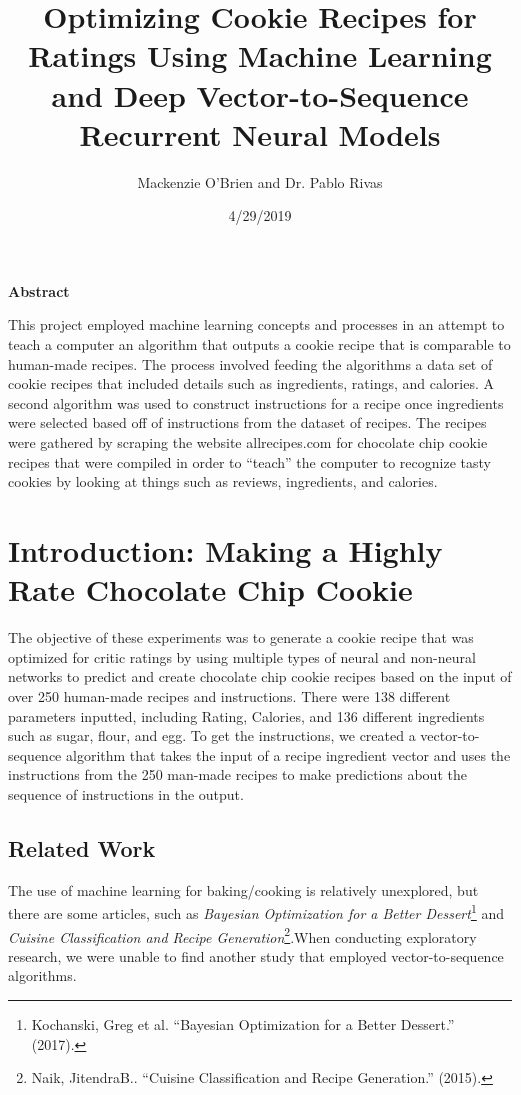 \documentclass[11pt, a4paper]{article}
\begin{document}
	
	\title{Optimizing Cookie Recipes for Ratings Using Machine Learning and Deep Vector-to-Sequence Recurrent Neural Models}
	\author{Mackenzie O'Brien and Dr. Pablo Rivas}
	\date{4/29/2019}
	\maketitle
	\begin{center}
		\textbf{Abstract}
	\end{center}

	This project employed machine learning concepts and processes in an attempt to teach a computer an algorithm that outputs a cookie recipe that is comparable to human-made recipes.
The process involved feeding the algorithms a data set of cookie recipes that included details such as ingredients, ratings, and calories. A second algorithm was used to construct instructions for a recipe once ingredients were selected based off of instructions from the dataset of recipes.
The recipes were gathered by scraping the website allrecipes.com for chocolate chip cookie recipes that were compiled in order to “teach” the computer to recognize tasty cookies by looking at things such as reviews, ingredients, and calories.
	
	\newpage
	
		\section{ Introduction: Making a Highly Rate Chocolate Chip Cookie}
		 The objective of these experiments was to generate a cookie recipe that was optimized for critic ratings by using multiple types of neural and non-neural networks to predict and create chocolate chip cookie recipes based on the input of over 250 human-made recipes and instructions. There were 138 different parameters inputted, including Rating, Calories, and 136 different ingredients such as sugar, flour, and egg.
		 \newline\newline
		 To get the instructions, we created a vector-to-sequence algorithm that takes the input of a recipe ingredient vector and uses the instructions from the 250 man-made recipes to make predictions about the sequence of instructions in the output.
		\subsection*{Related Work}
		The use of machine learning for baking/cooking is relatively unexplored, but there are some articles, such as \textit{Bayesian Optimization for a Better Dessert}\footnote{Kochanski, Greg et al. “Bayesian Optimization for a Better Dessert.” (2017).} and \textit{Cuisine Classification and Recipe Generation}\footnote{Naik, JitendraB.. “Cuisine Classification and Recipe Generation.” (2015).}.When conducting exploratory research, we were unable to find another study that employed vector-to-sequence algorithms. 
		
\end{document}

